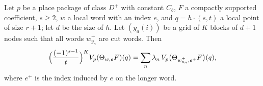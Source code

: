 \begin{theorem}\label{pf:thmS-carrier:degtop}
Let $p$ be a place package of class $D^+$ with constant $C_b$, $F$ a compactly supported coefficient, $s\ge2$, $w$ a local
word with an index $e$, and $q=h\cdot(s,t)$ a local point of size $r+1$; let $d$ be the size of $h$. Let $(y_a(i))$ be a grid
of $K$ blocks of $d+1$ nodes such that all words $w^+_{y_n}$ are cut words. Then
\begin{equation}\label{eq:pf:thmS-carrier:degtop}
\Bigl(\frac{(-1)^{s-1}}{t}\Bigr)^KV_p(\Theta_{w,e}F)(q)=\sum_n\lambda_n\,V_p\bigl(\Theta_{w^+_{y_n},e^+}F\bigr)(q),
\end{equation}
where $e^+$ is the index induced by $e$ on the longer word.
\end{theorem}

